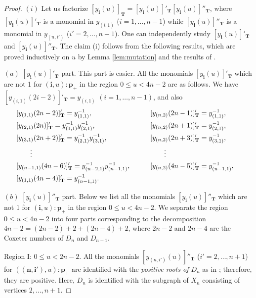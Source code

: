 \begin{proof}
$(i)$ Let us factorize $[y_{\mathbf{i}}(u)]_{\mathbf{T}}
=[y_{\mathbf{i}}(u)]'_{\mathbf{T}}
[y_{\mathbf{i}}(u)]''_{\mathbf{T}}$,
where
 $[y_{\mathbf{i}}(u)]'_{\mathbf{T}}$ is a monomial
in $y_{(i,1)}$ ($i=1,\dots,n-1$)
while
 $[y_{\mathbf{i}}(u)]''_{\mathbf{T}}$ is a monomial
in $y_{(n,i')}$ ($i'=2,\dots,n+1$).
One can independently study
$[y_{\mathbf{i}}(u)]'_{\mathbf{T}}$ and
$[y_{\mathbf{i}}(u)]''_{\mathbf{T}}$.
The claim  (i) follows from the following results,
which  are proved inductively on $u$
by Lemma \ref{lem:mutation} and the results of
\cite{Fomin03b,Fomin07}.

$(a)$ $[y_{\mathbf{i}}(u)]'_{\mathbf{T}}$ part.
This part is easier.
All the monomials $[y_{\mathbf{i}}(u)]'_{\mathbf{T}}$
 which are not 1 for $(\mathbf{i},u):\mathbf{p}_+$
in the region $0 \leq u < 4n-2$ are as follows.
We have $[y_{(i,1)}(2i-2)]'_{\mathbf{T}}=y_{(i,1)}$
$(i=1,\dots,n-1)$,
and also
\begin{alignat}{3}
& [y_{(1,1)}(2n-2)]'_{\mathbf{T}}=y_{(1,1)}^{-1},\qquad &&
[y_{(n,2)}(2n-1)]'_{\mathbf{T}}=y_{(1,1)}^{-1},&\notag\\
& [y_{(2,1)}(2n)]'_{\mathbf{T}}=y_{(1,1)}^{-1}y_{(2,1)}^{-1},\qquad &&
[y_{(n,2)}(2n+1)]'_{\mathbf{T}}=y_{(2,1)}^{-1},&\notag\\
\label{eq:y'part}
& [y_{(3,1)}(2n+2)]'_{\mathbf{T}}=y_{(2,1)}^{-1}y_{(3,1)}^{-1},\qquad &&
[y_{(n,2)}(2n+3)]'_{\mathbf{T}}=y_{(3,1)}^{-1},&\\
&\qquad \vdots & &\qquad \vdots & \notag\\
& [y_{(n-1,1)}(4n-6)]'_{\mathbf{T}}=y_{(n-2,1)}^{-1}y_{(n-1,1)}^{-1},\qquad &&
[y_{(n,2)}(4n-5)]'_{\mathbf{T}}=y_{(n-1,1)}^{-1},&\notag\\
& [y_{(1,1)}(4n-4)]'_{\mathbf{T}}=y_{(n-1,1)}^{-1}.&&& \notag
\end{alignat}

$(b)$  $[y_{\mathbf{i}}(u)]''_{\mathbf{T}}$ part.
Below we list all the monomials $[y_{\mathbf{i}}(u)]''_{\mathbf{T}}$
which are not 1 for $(\mathbf{i},u):\mathbf{p}_+$
in the region $0 \leq u < 4n-2$.
We separate the region $0 \leq u < 4n-2$ into four parts
corresponding to the decomposition
$4n-2=(2n-2)+2+(2n-4)+2$,
where $2n-2$ and $2n-4$ are the Coxeter numbers
of $D_{n}$ and $D_{n-1}$.


Region I: $0\leq u < 2n-2$.
All the  monomials
$[y_{(n,i')}(u)]''_{\mathbf{T}}$ ($i'=2,\dots,n+1$)
 for $(\mathbf{(n,i')},u):\mathbf{p}_+$
are identif\/ied with
the {\em positive roots of $D_n$} as in
\cite[Proposition 10.7]{Fomin07};
therefore, they are positive.
Here, $D_{n}$ is identif\/ied with the subgraph of $X_n$
consisting of vertices $2, \dots, n+1$.



\end{proof}
